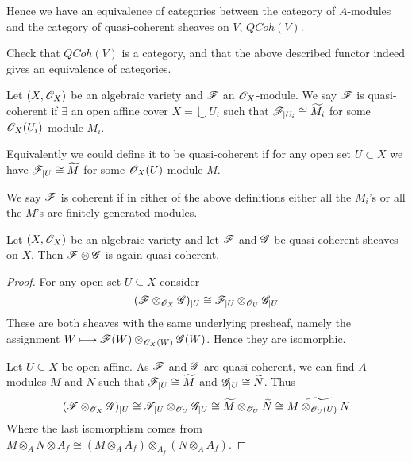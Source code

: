 Hence we have an equivalence of categories between the category of $A$-modules and the category of quasi-coherent sheaves on $V$, $QCoh(V)$. 

\begin{problem}
Check that $QCoh(V)$ is a category, and that the above described functor indeed gives an equivalence of categories. 
\end{problem}

\begin{definition}
Let $(X, \mathscr{O}_X)$ be an algebraic variety and $\mathscr{F}$ an $\mathscr{O}_X$-module. We say $\mathscr{F}$ is quasi-coherent if $\exists$ an open affine cover $X=\bigcup U_i$ such that $\mathscr{F}_{\vert U_i}\cong \widetilde{M_i}$ for some $\mathscr{O}_X(U_i)$-module $M_i$. 

Equivalently we could define it to be quasi-coherent if for any open set $U\subset X$ we have $\mathscr{F}_{\vert U}\cong \widetilde{M}$ for some $\mathscr{O}_X(U)$-module $M$. 

We say $\mathscr{F}$ is coherent if in either of the above definitions either all the $M_i$'s or all the $M$'s are finitely generated modules. 
\end{definition}

\begin{proposition}
Let $(X, \mathscr{O}_X)$ be an algebraic variety and let $\mathscr{F}$ and $\mathscr{G}$ be quasi-coherent sheaves on $X$. Then $\mathscr{F}\otimes\mathscr{G}$ is again quasi-coherent. 
\end{proposition}
\begin{proof}
For any open set $U\subseteq X$ consider 
\begin{equation*}
    (\mathscr{F}\otimes_{\mathscr{O}_X}\mathscr{G})_{\vert U} \cong \mathscr{F}_{\vert U}\otimes_{\mathscr{O}_U}\mathscr{G}_{\vert U}
\end{equation*}
These are both sheaves with the same underlying presheaf, namely the assignment $W\longmapsto \mathscr{F}(W)\otimes_{\mathscr{O}_X(W)}\mathscr{G}(W)$. Hence they are isomorphic. 

Let $U\subseteq X$ be open affine. As $\mathscr{F}$ and $\mathscr{G}$ are quasi-coherent, we can find $A$-modules $M$ and $N$ such that $\mathscr{F}_{\vert U}\cong \widetilde{M}$ and $\mathscr{G}_{\vert U}\cong \widetilde{N}$. Thus
\begin{equation*}
    (\mathscr{F}\otimes_{\mathscr{O}_X}\mathscr{G})_{\vert U} \cong \mathscr{F}_{\vert U}\otimes_{\mathscr{O}_U}\mathscr{G}_{\vert U}\cong \widetilde{M}\otimes_{\mathscr{O}_U}\widetilde{N}\cong \widetilde{ M\otimes_{\mathscr{O}_U(U)}N}
\end{equation*}
Where the last isomorphism comes from $M\otimes_A N\otimes A_f\cong (M\otimes_A A_f)\otimes_{A_f}(N\otimes_A A_f)$.  
\end{proof}


